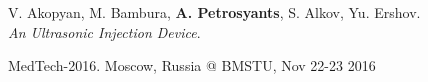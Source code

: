   \resumeProjectHeading
      {V. Akopyan, M. Bambura, \textbf{A. Petrosyants}, S. Alkov, Yu. Ershov.\\
    \textit{An Ultrasonic Injection Device}.}{}
      \begin{itemize}[leftmargin=0in, label={}]
      \small{\item{ 
              {MedTech-2016. Moscow, Russia @ BMSTU,  Nov 22-23 2016}
      }}
      \end{itemize}
\resumeSubHeadingListEnd
